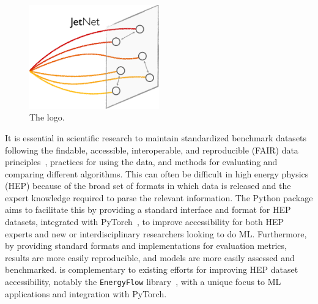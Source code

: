 \section{\jetnet}
\label{sec:06_jetnet_jetnet}

\begin{figure}[ht!]
    \centering
    \captionsetup{justification=centering}
    \includegraphics[width=0.5\textwidth]{figures/06-ML4Jets/jetnetlogo.pdf}
    \caption{The \jetnet logo.}
    \label{fig:06_jetnet_logo}
\end{figure}


It is essential in scientific research to maintain standardized benchmark datasets following the findable, accessible, interoperable, and reproducible (FAIR) data principles~\cite{Chen:2021euv}, practices for using the data, and methods for evaluating and comparing different algorithms.
This can often be difficult in high energy physics (HEP) because of the broad set of formats in which data is released and the expert knowledge required to parse the relevant information.
The \jetnet Python package aims to facilitate this by providing a standard interface and format for HEP datasets, integrated with PyTorch~\cite{NEURIPS2019_9015}, to improve accessibility for both HEP experts and new or interdisciplinary researchers looking to do ML.
Furthermore, by providing standard formats and implementations for evaluation metrics, results are more easily reproducible, and models are more easily assessed and benchmarked.
\jetnet is complementary to existing efforts for improving HEP dataset accessibility, notably the \texttt{EnergyFlow} library~\cite{Komiske:2019jim}, with a unique focus to ML applications and integration with PyTorch.

